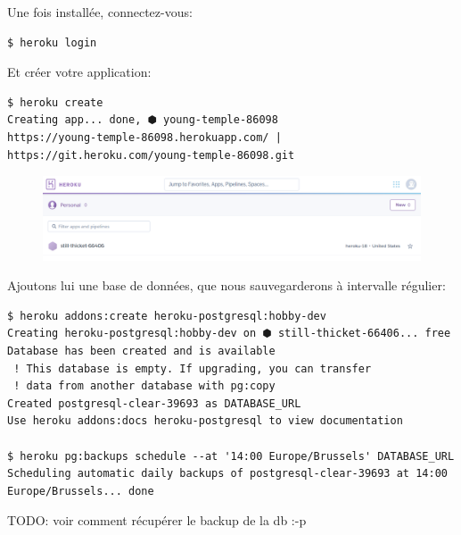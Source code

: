 \documentclass[11pt]{amsbook}
\begin{document}
Une fois installée, connectez-vous:


\begin{verbatim}
$ heroku login
\end{verbatim}

Et créer votre application:


\begin{verbatim}
$ heroku create
Creating app... done, ⬢ young-temple-86098
https://young-temple-86098.herokuapp.com/ | https://git.heroku.com/young-temple-86098.git
\end{verbatim}

\begin{figure}[h]{}
\centering\includegraphics[width=2.5truein]{images/deployment/heroku-app-created.png}
\caption{}

\end{figure}

Ajoutons lui une base de données, que nous sauvegarderons à intervalle régulier:


\begin{verbatim}
$ heroku addons:create heroku-postgresql:hobby-dev
Creating heroku-postgresql:hobby-dev on ⬢ still-thicket-66406... free
Database has been created and is available
 ! This database is empty. If upgrading, you can transfer
 ! data from another database with pg:copy
Created postgresql-clear-39693 as DATABASE_URL
Use heroku addons:docs heroku-postgresql to view documentation

$ heroku pg:backups schedule --at '14:00 Europe/Brussels' DATABASE_URL
Scheduling automatic daily backups of postgresql-clear-39693 at 14:00 Europe/Brussels... done
\end{verbatim}

TODO: voir comment récupérer le backup de la db :-p
\end{document}
